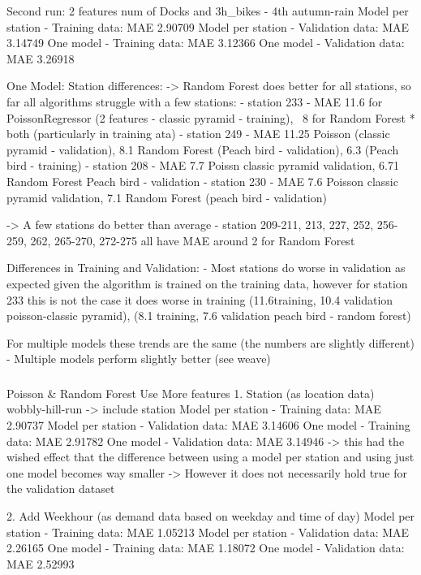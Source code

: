 \documentclass[a4paper]{article}
\begin{document}
    Second run: 2 features num of Docks and 3h\_bikes - 4th autumn-rain
    Model per station - Training data: MAE 2.90709
    Model per station - Validation data: MAE 3.14749
    One model - Training data: MAE 3.12366
    One model - Validation data: MAE 3.26918

    One Model:
    Station differences:
    -> Random Forest does better for all stations, so far all algorithms struggle with a few stations:
    - station 233 - MAE 11.6 for PoissonRegressor (2 features - classic pyramid - training), ~8 for Random Forest * both (particularly in training ata)
    - station 249 - MAE 11.25 Poisson (classic pyramid - validation), 8.1 Random Forest (Peach bird - validation),
    6.3 (Peach bird - training)
    - station 208 - MAE 7.7 Poissn classic pyramid validation, 6.71 Random Forest Peach bird - validation
    - station 230 - MAE 7.6 Poisson classic pyramid validation, 7.1 Random Forest (peach bird - validation)

    -> A few stations do better than average
    - station 209-211, 213, 227, 252, 256-259, 262, 265-270, 272-275 all have MAE around 2 for Random Forest

    Differences in Training and Validation:
    - Most stations do worse in validation as expected given the algorithm is trained on the training data, however for station
    233 this is not the case it does worse in training (11.6training, 10.4 validation poisson-classic pyramid),
    (8.1 training, 7.6 validation peach bird -  random forest)

    For multiple models these trends are the same (the numbers are slightly different)
    - Multiple models perform slightly better (see weave)

    \subsubsection*{}
    Poisson \& Random Forest Use More features
    1. Station (as location data)
    wobbly-hill-run -> include station
    Model per station - Training data: MAE 2.90737
    Model per station - Validation data: MAE 3.14606
    One model - Training data: MAE 2.91782
    One model - Validation data: MAE 3.14946
    -> this had the wished effect that the difference between using a model per station and using just one model
    becomes way smaller
    -> However it does not necessarily hold true for the validation dataset

    2. Add Weekhour (as demand data based on weekday and time of day)
    Model per station - Training data: MAE 1.05213
    Model per station - Validation data: MAE 2.26165
    One model - Training data: MAE 1.18072
    One model - Validation data: MAE 2.52993
\end{document}
